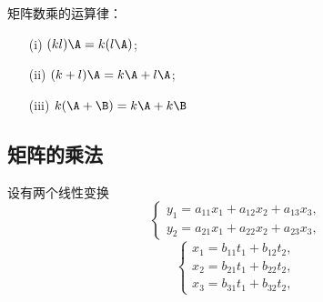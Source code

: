 \begin{zhu*}
\end{zhu*}

矩阵数乘的运算律：
\begin{itemize}
\item[(i)] $(k l)\A =  k(l \A)$;
\item[(ii)] $(k + l) \A  = k \A + l \A$;
\item[(iii)] $k (\A + \B)  = k \A + k \B$
\end{itemize}

\subsection{矩阵的乘法}


设有两个线性变换
\begin{equation}\label{lt1}
  \left\{
    \begin{array}{l}
      y_1 = a_{11} x_1 + a_{12} x_2 + a_{13} x_3, \\[0.2cm]
      y_2 = a_{21} x_1 + a_{22} x_2 + a_{23} x_3,
    \end{array}
  \right.
\end{equation}
\begin{equation}\label{lt2}
  \left\{
    \begin{array}{l}
      x_1 = b_{11} t_1 + b_{12} t_2 , \\[0.2cm]
      x_2 = b_{21} t_1 + b_{22} t_2 , \\[0.2cm]
      x_3 = b_{31} t_1 + b_{32} t_2 , 
    \end{array}
  \right.
\end{equation}

